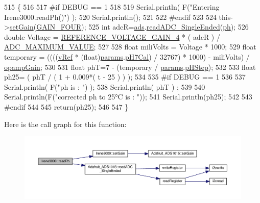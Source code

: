 \begin{DoxyCode}
515 \{
516 
517 \textcolor{preprocessor}{#if DEBUG == 1 }
518 
519     Serial.println( F(\textcolor{stringliteral}{"Entering Irene3000.readPh()"}) );
520     Serial.println();
521 
522 \textcolor{preprocessor}{#endif }
523 
524     this->\hyperlink{class_irene3000_aff7c5da186b388e7272e63ff88a20c34}{setGain}(\hyperlink{_cool_adafruit___a_d_s1015_8h_a3d6c0e15829a207b9155890811fa4781a33fa5521f4e806b7438052fcdbbf8660}{GAIN\_FOUR});
525     \textcolor{keywordtype}{int} adcR=\hyperlink{class_irene3000_a1215e77ba761c9908d80d691f149e135}{ads}.\hyperlink{class_adafruit___a_d_s1015_a40f38b9e1f3ec397c0670dd632510235}{readADC\_SingleEnded}(\hyperlink{_irene3000_8h_af771ceafe0e6524dd8497d4305dfe778}{ph});
526     \textcolor{keywordtype}{double} Voltage =  \hyperlink{_irene3000_8h_a51af1d267f8d2e05eff1e4f5c88d02e5}{REFERENCE\_VOLTAGE\_GAIN\_4} * ( adcR ) / 
      \hyperlink{_irene3000_8h_ae04444a85a37b5dce09107f2ce2b2c80}{ADC\_MAXIMUM\_VALUE};
527 
528     \textcolor{keywordtype}{float} miliVolts = Voltage * 1000;
529     \textcolor{keywordtype}{float} temporary = ((((\hyperlink{class_irene3000_a018e7ff9bee57e6d2b298667a668ba7e}{vRef} * (float)\hyperlink{class_irene3000_a136585a5ee7f9ac6ab52175fa153f8e3}{params}.\hyperlink{struct_irene3000_1_1parameters___t_a21265466a570d84bff914f26d2f7a03e}{pH7Cal}) / 32767) * 1000) - miliVolts) / 
      \hyperlink{class_irene3000_a4e588985ca74e5076029d5dee81034f2}{opampGain};
530     
531     \textcolor{keywordtype}{float} phT=7 - (temporary / \hyperlink{class_irene3000_a136585a5ee7f9ac6ab52175fa153f8e3}{params}.\hyperlink{struct_irene3000_1_1parameters___t_a61cfcc2539d5f630e9071f3753aba9fe}{pHStep});
532 
533     \textcolor{keywordtype}{float} ph25= ( phT / ( 1 + 0.009*( t - 25 ) ) );
534 
535 \textcolor{preprocessor}{#if DEBUG == 1 }
536 
537     Serial.println( F(\textcolor{stringliteral}{"ph is : "}) );
538     Serial.println( phT ) ;
539     
540     Serial.println(F(\textcolor{stringliteral}{"corrected ph to 25°C is : "}));
541     Serial.println(ph25);
542 
543 \textcolor{preprocessor}{#endif }
544 
545     \textcolor{keywordflow}{return}(ph25);
546 
547 \}
\end{DoxyCode}
Here is the call graph for this function\+:\nopagebreak
\begin{figure}[H]
\begin{center}
\leavevmode
\includegraphics[width=350pt]{d6/d03/class_irene3000_a436fc0a06681cd0784aba56b9707f19a_cgraph}
\end{center}
\end{figure}
